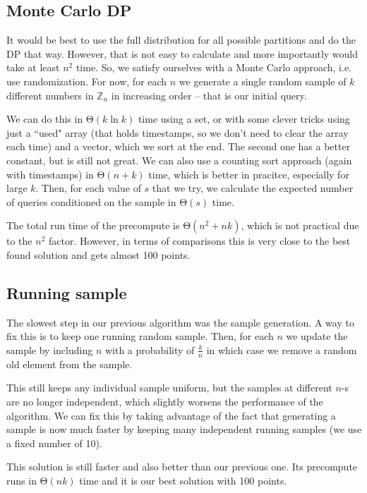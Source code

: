 \documentclass{article}
\begin{document}
\subsection{Monte Carlo DP}

It would be best to use the full distribution for all possible partitions and do the DP that way. However, that is not easy to calculate and more importantly would take at least $ n^2 $ time. So, we satisfy ourselves with a Monte Carlo approach, i.e. use randomization. For now, for each $ n $ we generate a single random sample of $ k $ different numbers in $ \mathbb{Z}_n $ in increasing order -- that is our initial query.

We can do this in $ \mathrm{\Theta}\left( k \ln{k} \right) $ time using a set, or with some clever tricks using just a ``used" array (that holds timestamps, so we don't need to clear the array each time) and a vector, which we sort at the end. The second one has a better constant, but is still not great. We can also use a counting sort approach (again with timestamps) in $ \mathrm{\Theta}\left( n + k \right) $ time, which is better in pracitce, especially for large $ k $. Then, for each value of $ s $ that we try, we calculate the expected number of queries conditioned on the sample in $ \mathrm{\Theta}\left( s \right) $ time.

The total run time of the precompute is $ \mathrm{\Theta}\left( n^2 + nk \right) $, which is not practical due to the $ n^2 $ factor. However, in terms of comparisons this is very close to the best found solution and gets almost 100 points.

\subsection{Running sample}

The slowest step in our previous algorithm was the sample generation. A way to fix this is to keep one running random sample. Then, for each $ n $ we update the sample by including $ n $ with a probability of $ \frac{k}{n} $ in which case we remove a random old element from the sample.

This still keeps any individual sample uniform, but the samples at different $n$-s are no longer independent, which slightly worsens the performance of the algorithm. We can fix this by taking advantage of the fact that generating a sample is now much faster by keeping many independent running samples (we use a fixed number of 10).

This solution is still faster and also better than our previous one. Its precompute runs in $ \mathrm{\Theta}\left( nk \right) $ time and it is our best solution with 100 points.
\end{document}

